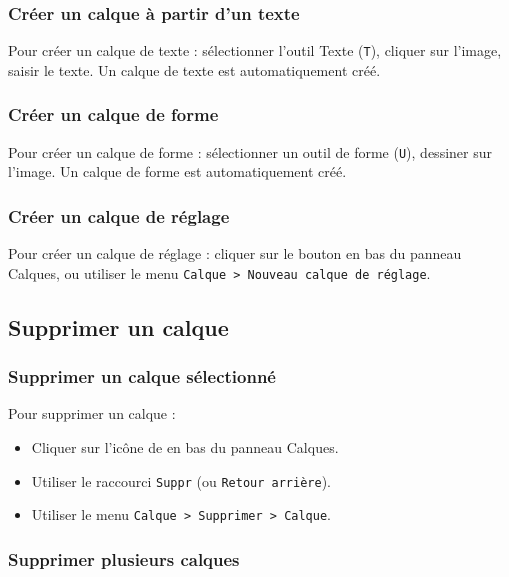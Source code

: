 \subsubsection{Créer un calque à partir d'un texte}

Pour créer un calque de texte : sélectionner l'outil Texte (\texttt{T}), cliquer sur l'image, saisir le texte. Un calque de texte est automatiquement créé.

\subsubsection{Créer un calque de forme}

Pour créer un calque de forme : sélectionner un outil de forme (\texttt{U}), dessiner sur l'image. Un calque de forme est automatiquement créé.

\subsubsection{Créer un calque de réglage}

Pour créer un calque de réglage : cliquer sur le bouton  en bas du panneau Calques, ou utiliser le menu \texttt{Calque > Nouveau calque de réglage}.

\subsection{Supprimer un calque}

\subsubsection{Supprimer un calque sélectionné}

Pour supprimer un calque :

\begin{itemize}
    \item Cliquer sur l'icône de  en bas du panneau Calques.
    \item Utiliser le raccourci \texttt{Suppr} (ou \texttt{Retour arrière}).
    \item Utiliser le menu \texttt{Calque > Supprimer > Calque}.
\end{itemize}

\subsubsection{Supprimer plusieurs calques}

